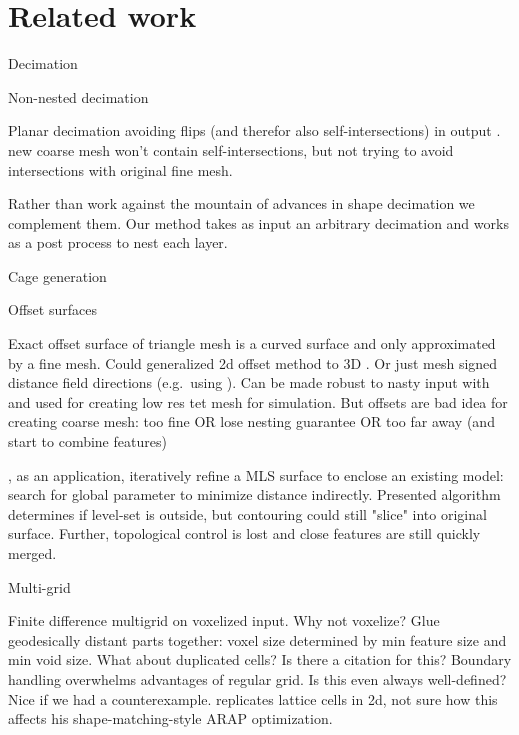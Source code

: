 \section{Related work}
\label{sec:related}

Decimation

Non-nested decimation \cite{Garland:1997:SSU}

Planar decimation avoiding flips (and therefor also self-intersections) in
output \cite{AnderssonGL09}.  \cite{gumhold2003intersection} new coarse mesh
won't contain self-intersections, but not trying to avoid intersections with
original fine mesh.

Rather than work against the mountain of advances in shape decimation we
complement them. Our method takes as input an arbitrary decimation and works as
a post process to nest each layer.

Cage generation

\cite{Deng:2011vr,Xian:2012tv}

Offset surfaces 

\cite{Campen:2010} Exact offset surface of triangle mesh is a curved surface
and only approximated by a fine mesh.  Could generalized 2d offset method
\cite{chen2005polygon} to 3D \cite{Jacobson:WN:2013}.  Or just mesh signed
distance field directions (e.g.\ using \cite{cgal}). Can be made robust to
nasty input with \cite{Xu:2014:SDF} and used for creating low res tet mesh for
simulation.
%
But offsets are bad idea for creating coarse mesh: too fine OR lose nesting
guarantee OR too far away (and start to combine features)

\cite{Shen:2004:IAI}, as an application, iteratively refine a MLS surface to
enclose an existing model: search for global parameter to minimize distance
indirectly. Presented algorithm determines if level-set is outside, but
contouring could still "slice" into original surface.  Further, topological
control is lost and close features are still quickly merged. 

Multi-grid 

\cite{McAdams:2011} Finite difference multigrid on voxelized input. Why not
voxelize? Glue geodesically distant parts together: voxel size determined by
min feature size and min void size. What about duplicated cells? Is there a
citation for this? Boundary handling overwhelms advantages of regular grid. Is
this even always well-defined? Nice if we had a counterexample.
\cite{Sykora09} replicates lattice cells in 2d, not sure how this affects his
shape-matching-style ARAP optimization.

